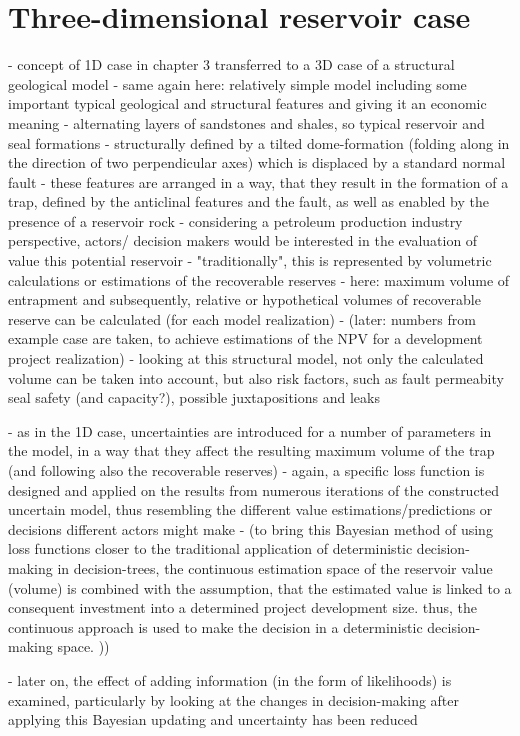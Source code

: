 \chapter{Three-dimensional reservoir case}
- concept of 1D case in chapter 3 transferred to a 3D case of a structural geological model
- same again here: relatively simple model including some important typical geological and structural features and giving it an economic meaning
- alternating layers of sandstones and shales, so typical reservoir and seal formations
- structurally defined by a tilted dome-formation (folding along in the direction of two perpendicular axes) which is displaced by a standard normal fault
- these features are arranged in a way, that they result in the formation of a trap, defined by the anticlinal features and the fault, as well as enabled by the presence of a reservoir rock
- considering a petroleum production industry perspective, actors/ decision makers would be interested in the evaluation of value this potential reservoir
- "traditionally", this is represented by volumetric calculations or estimations of the recoverable reserves
- here: maximum volume of entrapment and subsequently, relative or hypothetical volumes of recoverable reserve can be calculated (for each model realization)
- (later: numbers from example case are taken, to achieve estimations of the NPV for a development project realization)
- looking at this structural model, not only the calculated volume can be taken into account, but also risk factors, such as fault permeabity seal safety (and capacity?), possible juxtapositions and leaks

- as in the 1D case, uncertainties are introduced for a number of parameters in the model, in a way that they affect the resulting maximum volume of the trap (and following also the recoverable reserves)
- again, a specific loss function is designed and applied on the results from numerous iterations of the constructed uncertain model, thus resembling the different value estimations/predictions or decisions different actors might make
- (to bring this Bayesian method of using loss functions closer to the traditional application of deterministic decision-making in decision-trees, the continuous estimation space of the reservoir value (volume) is combined with the assumption, that the estimated value is linked to a consequent investment into a determined project development size. thus, the continuous approach is used to make the decision in a deterministic decision-making space. ))

- later on,  the effect of adding information (in the form of likelihoods) is examined, particularly by looking at the changes in decision-making after applying this Bayesian updating and uncertainty has been reduced

